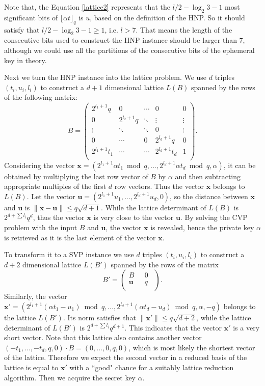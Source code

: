 Note that, the Equation \ref{lattice2} represents that the $l/2-\log_{2}{3} -1$ most significant bits of $\lfloor\alpha t\rfloor_q$ is $u$, based on the definition of the HNP.
So it should satisfy that $l/2-\log_{2}{3} -1 \geq 1$, i.e. $l > 7$.
That means the length of the consecutive bits used to  construct the HNP instance should be larger than $7$,
although we could use all the partitions of the consecutive bits of the ephemeral key in theory.

Next we turn the HNP instance into the lattice problem.
We use $d$ triples $(t_i, u_i, l_i)$ to construct a $d+1$ dimensional lattice $L(B)$ spanned by the rows of the following matrix:
$$B =
\left(
  \begin{array}{ccccc}
    2^{l_1+1}q & 0 & \cdots & 0 & 0 \\
    0 & 2^{l_2+1}q & \ddots & \vdots & \vdots \\
    \vdots & \ddots & \ddots & 0 & \vdots \\
    0 & \cdots & 0 & 2^{l_d+1}q & 0 \\
    2^{l_1+1}t_1 & \cdots & \cdots & 2^{l_d+1}t_d & 1 \\
  \end{array}
\right).
$$
Considering the vector $\textbf{x} = (2^{l_1+1}\alpha t_1 \bmod q, ..., 2^{l_d+1}\alpha t_d \bmod q, \alpha)$,
 it can be obtained by multiplying the last row vector of $B$ by $\alpha$ and then subtracting appropriate multiples of the first $d$ row vectors.
Thus the vector $\textbf{x}$ belongs to $L(B)$.
Let the vector $\textbf{u} = (2^{l_1+1}u_1, ..., 2^{l_d+1}u_d, 0)$,
 so the distance between $\textbf{x}$ and $\textbf{u}$ is $\|\textbf{x} - \textbf{u}\| \leq q\sqrt{d+1}$.
While the lattice determinant of $L(B)$ is $2^{d + \sum{l_i}}q^d$,
 thus the vector $\textbf{x}$ is very close to the vector $\textbf{u}$.
By solving the CVP problem with the input $B$ and $\textbf{u}$, the vector $\textbf{x}$ is revealed,
 hence the private key $\alpha$ is retrieved as it is the last element of the vector $\textbf{x}$.

To transform it to a SVP instance we use $d$ triples $(t_i, u_i, l_i)$ to construct a $d+2$ dimensional lattice $L(B')$ spanned by the rows of the matrix
$$B' =
\left(
  \begin{array}{cc}
     B\ \  &\  0\ \  \\
    \textbf{u}\ \ &\ q \ \  \\
  \end{array}
\right).
$$
Similarly, the vector $\textbf{x}' = (2^{l_1+1}(\alpha t_1 - u_1) \bmod q, ..., 2^{l_d+1}(\alpha t_d - u_d) \bmod q, \alpha, -q)$ belongs to the lattice $L(B')$.
 Its norm satisfies that $\|\textbf{x}'\| \leq q\sqrt{d+2}$,
  while the lattice determinant of $L(B')$ is $2^{d + \sum{l_i}}q^{d+1}$.
   This indicates that the vector $\textbf{x}'$ is a very short vector.
Note that this lattice also contains another vector $(-t_1, ..., -t_d, q, 0)\cdot B = (0, ..., 0, q, 0)$,
 which is most likely the shortest vector of the lattice.
Therefore we expect the second vector in a reduced basis of the lattice is equal to $\textbf{x}'$ with a ``good" chance for a suitably lattice reduction algorithm.
Then we acquire the secret key $\alpha$.

